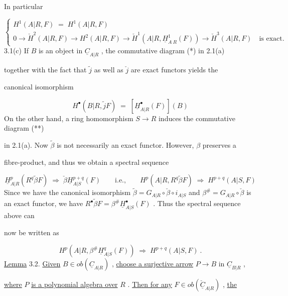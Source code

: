In particular

\begin{equation*}
\left\{
\begin{array}{l}
H^{1}(A|R,F) \;=\; H^{1}(A|R,F) \\[2ex]
0 \to \check{H}^{2}(A|R,F) \to H^{2}(A|R,F) \to \check{H}^{1}(A|R,\underline{H}^{1}_{A\ R}(F)) \to \check{H}^{3}(A|R,F) \quad \text{is exact.}
\end{array}
\right.
\end{equation*}
3.1(c)   If  $B$  is an object in  $\underline{C}_{A|R}$  , the commutative diagram (*) in 2.1(a)

together with the fact that  $\tilde{j}$  as well as  $\check{j}$  are exact functors yields the

canonical isomorphism

\begin{equation*}
H^{\bullet}(B|R,\tilde{j}F) \;=\; [\underline{H}^{\bullet}_{A|R}(F)](B)
\end{equation*}
On the other hand, a ring homomorphism  $S → R$  induces the commutative diagram (**)

in 2.1(a). Now  $\tilde{\beta}$  is not necessarily an exact functor. However,  $β$  preserves a

fibre-product, and thus we obtain a spectral sequence

\begin{equation*}
\underline{H}^{p}_{A|R}(R^{q}\tilde{\beta}F) \;\Rightarrow\; \check{\beta}\underline{H}^{p+q}_{A|S}(F) \qquad \text{i.e.,} \qquad H^{p}(A|R,R^{q}\tilde{\beta}F) \;\Rightarrow\; H^{p+q}(A|S,F)
\end{equation*}
Since we have the canonical isomorphism  $\tilde{\beta} = G_{A|R}\circ\check{\beta}\circ i_{A|S}$  and  $\beta^{\#} = G_{A|R}\circ\check{\beta}$  is an
exact functor, we have  $R^{\bullet}\tilde{\beta}F = \beta^{\#}\underline{H}^{\bullet}_{A|S}(F)$  . Thus the spectral sequence above can

now be written as

\begin{equation*}
H^{p}(A|R,\beta^{\#}\underline{H}^{q}_{A|S}(F)) \;\Rightarrow\; H^{p+q}(A|S,F) \ .
\end{equation*}
\underline{Lemma} 3.2.  \underline{Given}  $B \in ob(\underline{C}_{A|R})$  , \underline{choose a surjective arrow}  $P → B$  in  $\underline{C}_{B|R}$  ,

\underline{where}  $P$  \underline{is a polynomial algebra over}  $R$  . \underline{Then for any}  $F \in ob(\check{\underline{C}}_{A|R})$  , \underline{the}

